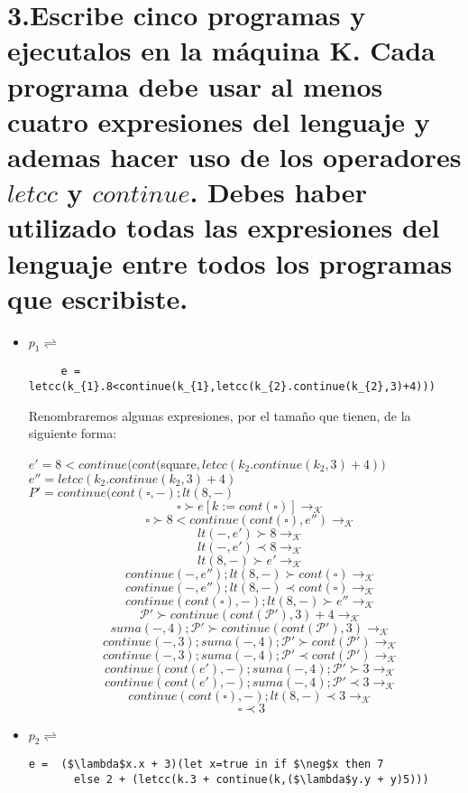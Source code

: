 \documentclass[11pt, a4paper]{report}
\begin{document}
\section*{3.Escribe cinco programas y ejecutalos en la m\'aquina K. Cada programa debe usar al menos cuatro 
expresiones del lenguaje y ademas hacer uso de los operadores   $letcc$ y $continue$. Debes haber utilizado todas
las expresiones del lenguaje entre todos los programas que escribiste.}

\begin{itemize}
\item $p_{1} \rightleftharpoons$
	\begin{lstlisting}
	 e = letcc(k_{1}.8<continue(k_{1},letcc(k_{2}.continue(k_{2},3)+4)))
	\end{lstlisting}		
	
Renombraremos algunas expresiones, por el tamaño que  tienen, de la siguiente forma:

$e' = 8 < continue(cont($square$,letcc(k_{2}.continue(k_{2},3)+4))$\\
$e'' = letcc(k_{2}.continue(k_{2},3)+4)$\\
$P'= continue(cont(\square, -);lt(8,-)$\\

 $$\quad \square \succ e[k:=cont(\square)] \rightarrow_{\mathcal{K}}$$
 $$\quad \square \succ 8 < continue(cont(\square), e'') \rightarrow_{\mathcal{K}}$$
 $$\quad lt(-,e') \succ 8 \rightarrow_{\mathcal{K}}$$ 
 $$\quad lt(-,e') \prec 8 \rightarrow_{\mathcal{K}}$$ 
 $$\quad lt(8,-) \succ e' \rightarrow_{\mathcal{K}}$$
 $$\quad continue(-,e'');lt(8,-) \succ cont(\square) \rightarrow_{\mathcal{K}}$$
 $$\quad continue(-,e'');lt(8,-) \prec cont(\square) \rightarrow_{\mathcal{K}}$$
 $$\quad continue(cont(\square), -);lt(8,-) \succ e'' \rightarrow_{\mathcal{K}}$$
 $$\quad \mathcal{P}' \succ continue(cont(\mathcal{P}'),3)+4 \rightarrow_{\mathcal{K}}$$
 $$\quad suma(-,4);\mathcal{P}' \succ continue(cont(\mathcal{P}'),3) \rightarrow_{\mathcal{K}}$$
 $$\quad continue(-,3);suma(-,4); \mathcal{P}' \succ cont(\mathcal{P}') \rightarrow_{\mathcal{K}}$$
 $$\quad continue(-,3);suma(-,4); \mathcal{P}' \prec cont(\mathcal{P}') \rightarrow_{\mathcal{K}}$$
 $$\quad continue(cont(e'),-);suma(-,4);\mathcal{P}' \succ 3 \rightarrow_{\mathcal{K}}$$
 $$\quad continue(cont(e'),-);suma(-,4);\mathcal{P}' \prec 3 \rightarrow_{\mathcal{K}}$$
 $$\quad continue(cont(\square),-);lt(8,-) \prec 3 \rightarrow_{\mathcal{K}}$$
 $$\quad \square \prec 3$$

\item $p_{2} \rightleftharpoons$ 
 \begin{lstlisting}[mathescape=true]
      e =  ($\lambda$x.x + 3)(let x=true in if $\neg$x then 7 
       else 2 + (letcc(k.3 + continue(k,($\lambda$y.y + y)5)))
		\end{lstlisting}


\end{itemize}
\end{document}
